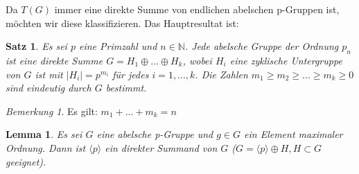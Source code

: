 \documentclass[12pt]{scrartcl} %
\newtheorem{thm}{Satz}
\newtheorem{lemma}{Lemma}
\theoremstyle{definition}
\theoremstyle{remark}
\newtheorem*{nb}{Bemerkung}
\begin{document}
Da $T(G)$ immer eine direkte Summe von endlichen abelschen p-Gruppen ist, möchten wir diese klassifizieren. Das Hauptresultat ist:

\begin{thm}
Es sei $p$ eine Primzahl und $n\in \mathbb{N}$. 
Jede abelsche Gruppe der Ordnung $p_{n}$ ist eine direkte Summe $G=H_{1}\oplus ...\oplus H_{k}$, wobei $H_{i}$ eine zyklische Untergruppe von $G$ ist mit $|H_{i}|=p^{m_{i}}$ für jedes $i=1,...,k$.
Die Zahlen $m_{1}\geq m_{2}\geq ...\geq m_{k}\geq 0$ sind eindeutig durch $G$ bestimmt.
\end{thm}

\begin{nb}
Es gilt: $m_{1}+...+m_{k}=n$
\end{nb}

\begin{lemma}
Es sei $G$ eine abelsche p-Gruppe und $g\in G$ ein Element maximaler Ordnung. 
Dann ist $\langle p\rangle$ ein direkter Summand von $G$ ($G=\langle p\rangle\oplus H, H\subset G$ geeignet).
\end{lemma}
\end{document}
